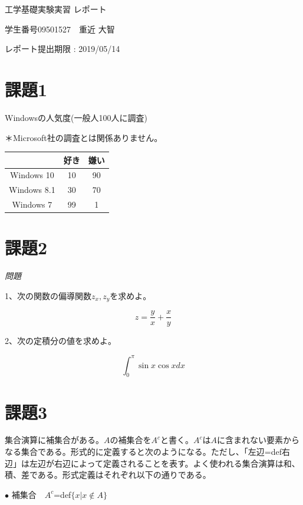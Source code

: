 \documentclass[11pt]{jarticle}
\begin{document}
\begin{center}
工学基礎実験実習 レポート

学生番号09501527　重近 大智

レポート提出期限 : 2019/05/14
\end{center}
\section{課題1}
Windowsの人気度(一般人100人に調査)

＊Microsoft社の調査とは関係ありません。

\begin{tabular}{|c|c|c|}
\hline
      &好き&嫌い\\
\hline
Windows 10&10&90\\

Windows 8.1&30&70\\

Windows 7&99&1\\
\hline

\end{tabular}
\section{課題2}
\begin{center}
\large \em 問題
\end{center}
1、次の関数の偏導関数$z_x ,z_y$を求めよ。
\begin{center}

\begin{equation}
z=\frac{y}{x}+\frac{x}{y}
\end{equation}
\end{center}

2、次の定積分の値を求めよ。
\begin{center}
\begin{equation}
\int_0^π {\sin x \cos xdx}
\end{equation}
\end{center}
\section{課題3}
集合演算に補集合がある。$A$の補集合を$A^c$と書く。$A^c$は$A$に含まれない要素からなる集合である。形式的に定義すると次のようになる。ただし、「左辺=def右辺」は左辺が右辺によって定義されることを表す。よく使われる集合演算は和、積、差である。形式定義はそれぞれ以下の通りである。

$\bullet$ 補集合　$A^c$=def$\{x|x \notin A\}$
\end{document}

